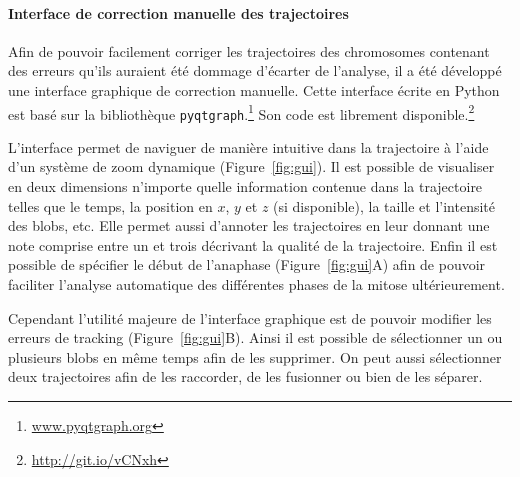 \documentclass[12pt,a4paper,twoside,openright]{book}
\let\oldparagraph\paragraph
\renewcommand{\paragraph}[1]{\oldparagraph{#1}\mbox{}}
\begin{document}
\paragraph{Interface de correction manuelle des
trajectoires}\label{interface-de-correction-manuelle-des-trajectoires}

Afin de pouvoir facilement corriger les trajectoires des chromosomes
contenant des erreurs qu'ils auraient été dommage d'écarter de
l'analyse, il a été développé une interface graphique de correction
manuelle. Cette interface écrite en Python est basé sur la bibliothèque
\texttt{pyqtgraph}.\footnote{\url{www.pyqtgraph.org}} Son code est
librement disponible.\footnote{\url{http://git.io/vCNxh}}

L'interface permet de naviguer de manière intuitive dans la trajectoire
à l'aide d'un système de zoom dynamique (Figure~\ref{fig:gui}). Il est
possible de visualiser en deux dimensions n'importe quelle information
contenue dans la trajectoire telles que le temps, la position en \(x\),
\(y\) et \(z\) (si disponible), la taille et l'intensité des blobs, etc.
Elle permet aussi d'annoter les trajectoires en leur donnant une note
comprise entre un et trois décrivant la qualité de la trajectoire. Enfin
il est possible de spécifier le début de l'anaphase
(Figure~\ref{fig:gui}A) afin de pouvoir faciliter l'analyse automatique
des différentes phases de la mitose ultérieurement.

Cependant l'utilité majeure de l'interface graphique est de pouvoir
modifier les erreurs de tracking (Figure~\ref{fig:gui}B). Ainsi il est
possible de sélectionner un ou plusieurs blobs en même temps afin de les
supprimer. On peut aussi sélectionner deux trajectoires afin de les
raccorder, de les fusionner ou bien de les séparer.
\end{document}
